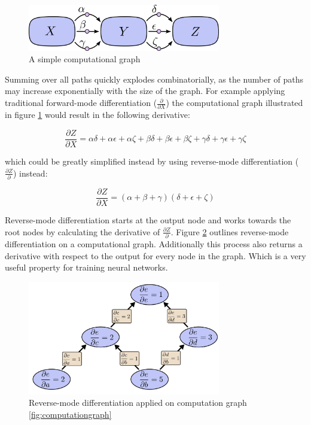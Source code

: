 \documentclass[draft,final,oneside]{vutinfth} %
\begin{document}
\begin{figure}[ht]
	\centering
  	\includegraphics[width=0.75\textwidth]{graphics/computationgraphsimple.png}
	\caption{A simple computational graph \cite{colahbackprop}}
	\label{fig:computationgraphsimple}
\end{figure}

Summing over all paths quickly explodes combinatorially, as the number of paths may increase exponentially with the size of the graph. For example applying traditional forward-mode differentiation ($\frac{\partial}{\partial X}$) the computational graph illustrated in figure \ref{fig:computationgraphsimple} would result in the following derivative:

\begin{equation}
\frac{\partial Z}{\partial X} = \alpha \delta + \alpha \epsilon + \alpha \zeta + \beta \delta + \beta \epsilon + \beta \zeta + \gamma \delta + \gamma \epsilon + \gamma \zeta
\end{equation}

which could be greatly simplified instead by using reverse-mode differentiation  ($\frac{\partial Z}{\partial}$) instead:

\begin{equation}
\frac{\partial Z}{\partial X} = (\alpha + \beta + \gamma)(\delta + \epsilon + \zeta)
\end{equation}

Reverse-mode differentiation starts at the output node and works towards the root nodes by calculating the derivative of $\frac{\partial Z}{\partial}$. Figure \ref{fig:computationgraphreverse} outlines reverse-mode differentiation on a computational graph. Additionally this process also returns a derivative with respect to the output for every node in the graph. Which is a very useful property for training neural networks.

\begin{figure}[ht]
	\centering
  	\includegraphics[width=0.75\textwidth]{graphics/computationgraphreverse.png}
	\caption{Reverse-mode differentiation applied on computation graph \ref{fig:computationgraph} \cite{colahbackprop}}
	\label{fig:computationgraphreverse}
\end{figure}
\end{document}
